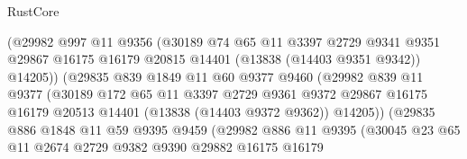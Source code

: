 \begin{lexlean}{RustCore}
\begin{coremodule}
                            (@29982
                              @997
                              @11
                              @9356
                              (@30189
                                @74
                                @65
                                @11
                                @3397
                                @2729
                                @9341
                                @9351
                                @29867
                                @16175
                                @16179
                                @20815
                                @14401
                                (@13838 (@14403 @9351 @9342))
                                @14205))
                            (@29835
                              @839
                              @1849
                              @11
                              @60
                              @9377
                              @9460
                              (@29982
                                @839
                                @11
                                @9377
                                (@30189
                                  @172
                                  @65
                                  @11
                                  @3397
                                  @2729
                                  @9361
                                  @9372
                                  @29867
                                  @16175
                                  @16179
                                  @20513
                                  @14401
                                  (@13838 (@14403 @9372 @9362))
                                  @14205))
                              (@29835
                                @886
                                @1848
                                @11
                                @59
                                @9395
                                @9459
                                (@29982
                                  @886
                                  @11
                                  @9395
                                  (@30045
                                    @23
                                    @65
                                    @11
                                    @2674
                                    @2729
                                    @9382
                                    @9390
                                    @29882
                                    @16175
                                    @16179

\end{coremodule}
\end{lexlean}

